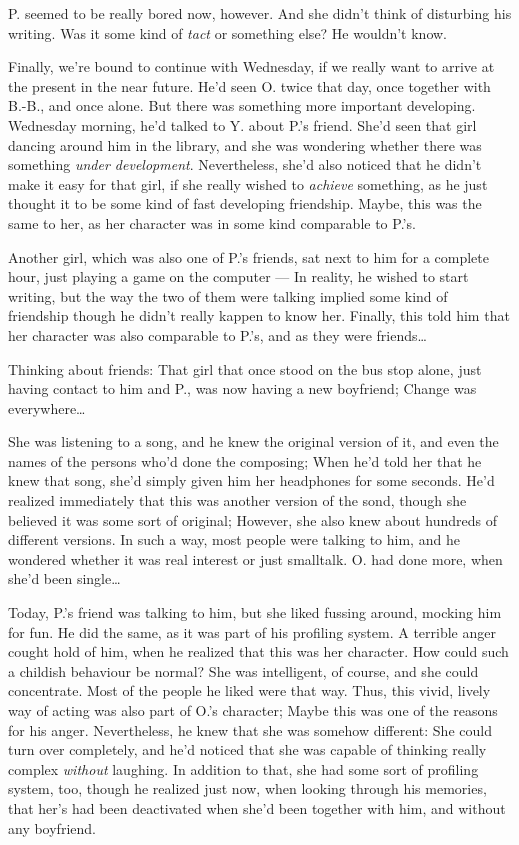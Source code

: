 P. seemed to be really bored now, however. And she didn't think of disturbing his writing. Was it some kind of \emph{tact} or something else?
He wouldn't know.

Finally, we're bound to continue with Wednesday, if we really want to arrive at the present in the near future. 
He'd seen O. twice that day, once together with B.-B., and once alone. 
But there was something more important developing. 
Wednesday morning, he'd talked to Y. about P.'s friend. 
She'd seen that girl dancing around him in the library, and she was wondering whether there was something \emph{under development}. Nevertheless, she'd also noticed that he didn't make it easy for that girl, if she really wished to \emph{achieve} something, as he just thought it to be some kind of fast developing friendship. 
Maybe, this was the same to her, as her character was in some kind comparable to P.'s.

Another girl, which was also one of P.'s friends, sat next to him for a complete hour, just playing a game on the computer --- In reality, he wished to start writing, but the way the two of them were talking implied some kind of friendship though he didn't really kappen to know her. Finally, this told him that her character was also comparable to P.'s, and as they were friends\ldots

Thinking about friends: That girl that once stood on the bus stop alone, just having contact to him and P., was now having a new boyfriend; Change was everywhere\ldots

She was listening to a song, and he knew the original version of it, and even the names of the persons who'd done the composing; When he'd told her that he knew that song, she'd simply given him her headphones for some seconds. He'd realized immediately that this was another version of the sond, though she believed it was some sort of original; However, she also knew about hundreds of different versions. 
In such a way, most people were talking to him, and he wondered whether it was real interest or just smalltalk. O. had done more, when she'd been single\ldots

Today, P.'s friend was talking to him, but she liked fussing around, mocking him for fun. He did the same, as it was part of his profiling system. 
A terrible anger cought hold of him, when he realized that this was her character. How could such a childish behaviour be normal? She was intelligent, of course, and she could concentrate. 
Most of the people he liked were that way. Thus, this vivid, lively way of acting was also part of O.'s character; Maybe this was one of the reasons for his anger. Nevertheless, he knew that she was somehow different: She could turn over completely, and he'd noticed that she was capable of thinking really complex \emph{without} laughing. In addition to that, she had some sort of profiling system, too, though he realized just now, when looking through his memories, that her's had been deactivated when she'd been together with him, and without any boyfriend.

